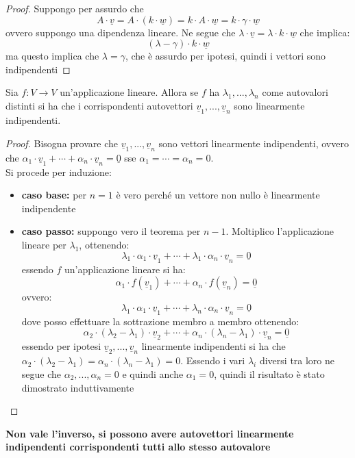\documentclass[a4paper,12pt, oneside]{book}
\begin{document}
\begin{proof}
Suppongo per assurdo che $$A\cdot \underline{v}=A\cdot(k\cdot \underline{w})=k\cdot A\cdot\underline{w}=k\cdot \gamma\cdot \underline{w}$$
ovvero suppongo una dipendenza lineare. Ne segue che $\lambda\cdot \underline{v}=\lambda\cdot k\cdot \underline{w}$ che implica:
$$(\lambda-\gamma)\cdot k\cdot\underline{w}$$
ma questo implica che $\lambda=\gamma$, che è assurdo per ipotesi, quindi i vettori sono indipendenti
\end{proof}
\begin{teorema}
Sia $f:V\to V$ un'applicazione lineare. Allora se $f$ ha $\lambda_1,...,\lambda_n$ come autovalori distinti si ha che i corrispondenti autovettori $\underline{v}_1,...,\underline{v}_n$ sono linearmente indipendenti.
\end{teorema}
\begin{proof}
Bisogna provare che $\underline{v}_1,...,\underline{v}_n$ sono vettori linearmente indipendenti, ovvero che $\alpha_1\cdot\underline{v}_1+\cdots+\alpha_n\cdot \underline{v}_n=\underline{0}$ sse $\alpha_1=\cdots=\alpha_n=0$.\\
Si procede per induzione:
\begin{itemize}
\item \textbf{caso base:} per $n=1$ è vero perché un vettore non nullo è linearmente indipendente
\item \textbf{caso passo:} suppongo vero il teorema per $n-1$. Moltiplico l'applicazione lineare per $\lambda_1$, ottenendo:
$$\lambda_1\cdot\alpha_1\cdot\underline{v}_1+\cdots+\lambda_1\cdot\alpha_n\cdot \underline{v}_n=\underline{0}$$
essendo $f$ un'applicazione lineare si ha:
$$\alpha_1\cdot f(\underline{v}_1)+\cdots+\alpha_n\cdot f(\underline{v}_n)=\underline{0}$$
ovvero:
$$\lambda_1\cdot\alpha_1\cdot\underline{v}_1+\cdots+\lambda_n\cdot\alpha_n\cdot \underline{v}_n=\underline{0}$$
dove posso effettuare la sottrazione membro a membro ottenendo:
$$\alpha_2\cdot (\lambda_2-\lambda_1)\cdot\underline{v}_2+\cdots+\alpha_n\cdot(\lambda_n-\lambda_1)\cdot \underline{v}_n=\underline{0}$$
essendo per ipotesi $\underline{v}_2,...,\underline{v}_n$ linearmente indipendenti si ha che $\alpha_2\cdot (\lambda_2-\lambda_1)=\alpha_n\cdot(\lambda_n-\lambda_1)=0$. Essendo i vari $\lambda_i$ diversi tra loro ne segue che $\alpha_2,...,\alpha_n=0$ e quindi anche $\alpha_1=0$, quindi il risultato è stato dimostrato induttivamente
\end{itemize}
\end{proof}
\textbf{Non vale l'inverso, si possono avere autovettori linearmente indipendenti  corrispondenti tutti allo stesso autovalore}
\newpage
\end{document}
